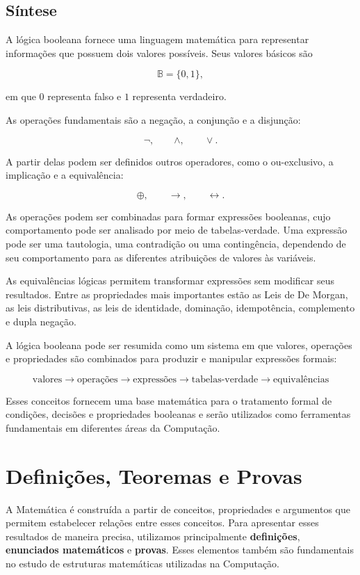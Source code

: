 \documentclass[
  brazilian,
  letterpaper,
]{book}
\theoremstyle{plain}
\theoremstyle{definition}
\theoremstyle{remark}
\begin{document}
\subsection{Síntese}\label{suxedntese}

A lógica booleana fornece uma linguagem matemática para representar
informações que possuem dois valores possíveis. Seus valores básicos são

\[
\mathbb{B}=\{0,1\},
\]

em que \(0\) representa falso e \(1\) representa verdadeiro.

As operações fundamentais são a negação, a conjunção e a disjunção:

\[
\neg,\qquad
\wedge,\qquad
\vee.
\]

A partir delas podem ser definidos outros operadores, como o
ou-exclusivo, a implicação e a equivalência:

\[
\oplus,\qquad
\rightarrow,\qquad
\leftrightarrow.
\]

As operações podem ser combinadas para formar expressões booleanas, cujo
comportamento pode ser analisado por meio de tabelas-verdade. Uma
expressão pode ser uma tautologia, uma contradição ou uma contingência,
dependendo de seu comportamento para as diferentes atribuições de
valores às variáveis.

As equivalências lógicas permitem transformar expressões sem modificar
seus resultados. Entre as propriedades mais importantes estão as Leis de
De Morgan, as leis distributivas, as leis de identidade, dominação,
idempotência, complemento e dupla negação.

A lógica booleana pode ser resumida como um sistema em que valores,
operações e propriedades são combinados para produzir e manipular
expressões formais:

\[
\boxed{
\text{valores}
\longrightarrow
\text{operações}
\longrightarrow
\text{expressões}
\longrightarrow
\text{tabelas-verdade}
\longrightarrow
\text{equivalências}
}
\]

Esses conceitos fornecem uma base matemática para o tratamento formal de
condições, decisões e propriedades booleanas e serão utilizados como
ferramentas fundamentais em diferentes áreas da Computação.

\section{Definições, Teoremas e
Provas}\label{definiuxe7uxf5es-teoremas-e-provas}

A Matemática é construída a partir de conceitos, propriedades e
argumentos que permitem estabelecer relações entre esses conceitos. Para
apresentar esses resultados de maneira precisa, utilizamos
principalmente \textbf{definições}, \textbf{enunciados matemáticos} e
\textbf{provas}. Esses elementos também são fundamentais no estudo de
estruturas matemáticas utilizadas na Computação.
\end{document}
